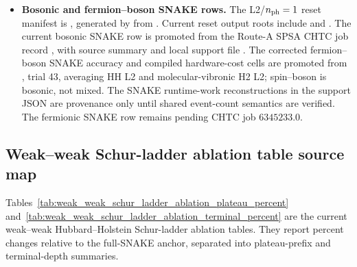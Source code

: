 \documentclass[
  reprint,
  amsmath,
  amssymb,
  aps,
  pra,
  nofootinbib,
  superscriptaddress,
  floatfix
]{revtex4-2}
\begin{document}
\begin{itemize}
\item \textbf{Bosonic and fermion--boson SNAKE rows.} The L2/$n_{\rm ph}=1$ reset manifest is , generated by  from . Current reset output roots include  and . The current bosonic SNAKE row is promoted from the Route-A SPSA CHTC job record , with source summary  and local support file . The corrected fermion--boson SNAKE accuracy and compiled hardware-cost cells are promoted from , trial 43, averaging HH L2 and molecular-vibronic H2 L2; spin--boson is bosonic, not mixed. The SNAKE runtime-work reconstructions in the support JSON are provenance only until shared event-count semantics are verified. The fermionic SNAKE row remains pending CHTC job $6345233.0$.
\end{itemize}

\subsection{Weak--weak Schur-ladder ablation table source map}
\label{app:table_ii_source_map}

Tables~\ref{tab:weak_weak_schur_ladder_ablation_plateau_percent} and~\ref{tab:weak_weak_schur_ladder_ablation_terminal_percent} are the current weak--weak Hubbard--Holstein Schur-ladder ablation tables. They report percent changes relative to the full-SNAKE anchor, separated into plateau-prefix and terminal-depth summaries.
\end{document}

